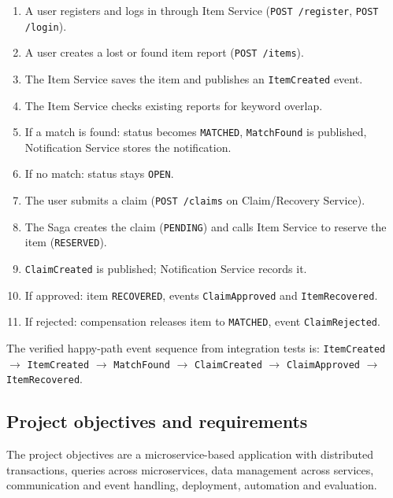 \documentclass[11pt,a4paper]{article}
\begin{document}
\begin{enumerate}
    \item A user registers and logs in through Item Service (\texttt{POST /register}, \texttt{POST /login}).
    \item A user creates a lost or found item report (\texttt{POST /items}).
    \item The Item Service saves the item and publishes an \texttt{ItemCreated} event.
    \item The Item Service checks existing reports for keyword overlap.
    \item If a match is found: status becomes \texttt{MATCHED}, \texttt{MatchFound} is published, Notification
    Service stores the notification.
    \item If no match: status stays \texttt{OPEN}.
    \item The user submits a claim (\texttt{POST /claims} on Claim/Recovery Service).
    \item The Saga creates the claim (\texttt{PENDING}) and calls Item Service to reserve the item
    (\texttt{RESERVED}).
    \item \texttt{ClaimCreated} is published; Notification Service records it.
    \item If approved: item \texttt{RECOVERED}, events \texttt{ClaimApproved} and \texttt{ItemRecovered}.
    \item If rejected: compensation releases item to \texttt{MATCHED}, event \texttt{ClaimRejected}.
\end{enumerate}

The verified happy-path event sequence from integration tests is:
\texttt{ItemCreated} $\rightarrow$ \texttt{ItemCreated} $\rightarrow$ \texttt{MatchFound} $\rightarrow$
\texttt{ClaimCreated} $\rightarrow$ \texttt{ClaimApproved} $\rightarrow$ \texttt{ItemRecovered}.

\subsection{Project objectives and requirements}

The project objectives are a microservice-based application with distributed transactions,
queries across microservices, data management across services, communication and event handling,
deployment, automation and evaluation.

\begingroup
\small
\renewcommand{\arraystretch}{1.35}
\setlength{\tabcolsep}{6pt}
\end{document}
